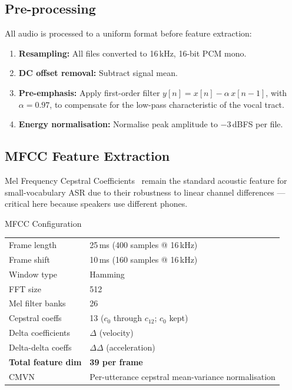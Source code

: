 \documentclass[12pt,a4paper]{article}
\begin{document}
\subsection{Pre-processing}

All audio is processed to a uniform format before feature extraction:

\begin{enumerate}[leftmargin=1.5em, itemsep=2pt]
  \item \textbf{Resampling:} All files converted to 16\,kHz, 16-bit PCM mono.
  \item \textbf{DC offset removal:} Subtract signal mean.
  \item \textbf{Pre-emphasis:} Apply first-order filter
        $y[n] = x[n] - \alpha\,x[n-1]$, with $\alpha = 0.97$,
        to compensate for the low-pass characteristic of the vocal tract.
  \item \textbf{Energy normalisation:} Normalise peak amplitude to $-3$\,dBFS
        per file.
\end{enumerate}

\subsection{MFCC Feature Extraction}
\label{sec:mfcc}

Mel Frequency Cepstral Coefficients~\cite{davis1980mfcc} remain the standard
acoustic feature for small-vocabulary ASR due to their robustness to linear
channel differences --- critical here because speakers use different phones.

\begin{keybox}{MFCC Configuration}
\begin{tabular}{ll}
Frame length      & 25\,ms (400 samples @ 16\,kHz) \\
Frame shift       & 10\,ms (160 samples @ 16\,kHz) \\
Window type       & Hamming \\
FFT size          & 512 \\
Mel filter banks  & 26 \\
Cepstral coeffs   & 13 ($c_0$ through $c_{12}$; $c_0$ kept) \\
Delta coefficients & $\Delta$ (velocity) \\
Delta-delta coeffs & $\Delta\Delta$ (acceleration) \\
\textbf{Total feature dim} & \textbf{39 per frame} \\
CMVN              & Per-utterance cepstral mean-variance normalisation \\
\end{tabular}
\end{keybox}
\end{document}
